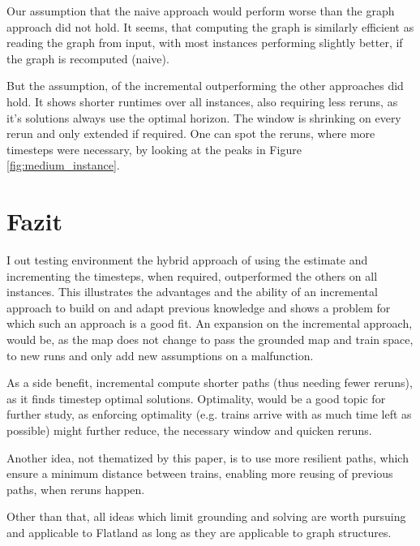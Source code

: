 Our assumption that the naive approach would perform worse than the graph approach did not hold. It seems, that computing the graph is similarly efficient as reading the graph from input, with most instances performing slightly better, if the graph is recomputed (naive).

But the assumption, of the incremental outperforming the other approaches did hold. It shows shorter runtimes over all instances, also requiring less reruns, as it's solutions always use the optimal horizon. The window is shrinking on every rerun and only extended if required. One can spot the reruns, where more timesteps were necessary, by looking at the peaks in Figure \ref{fig:medium_instance}.

\section{Fazit}
I out testing environment the hybrid approach of using the estimate and incrementing the timesteps, when required, outperformed the others on all instances. This illustrates the advantages and the ability of an incremental approach to build on and adapt previous knowledge and shows a problem for which such an approach is a good fit. An expansion on the incremental approach, would be, as the map does not change to pass the grounded map and train space, to new runs and only add new assumptions on a malfunction.

As a side benefit, incremental compute shorter paths (thus needing fewer reruns), as it finds timestep optimal solutions. Optimality, would be a good topic for further study, as enforcing optimality (e.g. trains arrive with as much time left as possible) might further reduce, the necessary window and quicken reruns.

Another idea, not thematized by this paper, is to use more resilient paths, which ensure a minimum distance between trains, enabling more reusing of previous paths, when reruns happen.  

Other than that, all ideas which limit grounding and solving are worth pursuing and applicable to Flatland as long as they are applicable to graph structures.
